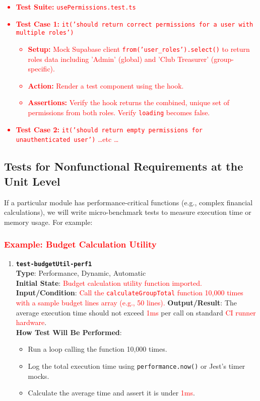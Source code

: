 \documentclass[12pt, titlepage]{article}
\begin{document}
\textcolor{red}{
\begin{itemize}
    \item \textbf{Test Suite:} \texttt{usePermissions.test.ts}
    \item \textbf{Test Case 1:} \texttt{it('should return correct permissions for a user with multiple roles')}
        \begin{itemize}
            \item \textbf{Setup:} Mock Supabase client \texttt{from('user\_roles').select()} to return roles data including 'Admin' (global) and 'Club Treasurer' (group-specific).
            \item \textbf{Action:} Render a test component using the hook.
            \item \textbf{Assertions:} Verify the hook returns the combined, unique set of permissions from both roles. Verify \texttt{loading} becomes false.
        \end{itemize}
    \item \textbf{Test Case 2:} \texttt{it('should return empty permissions for unauthenticated user')}
       \textcolor{red}{\dots etc \dots}
\end{itemize}
}

\subsection{Tests for Nonfunctional Requirements at the Unit Level}
If a particular module has performance-critical functions (e.g., complex financial calculations), we will write micro-benchmark tests to measure execution time or memory usage. For example:

\subsubsection{\textcolor{red}{Example: Budget Calculation Utility}}
\begin{enumerate}
    \item \textbf{\texttt{test-budgetUtil-perf1}} \\
        \textbf{Type}: Performance, Dynamic, Automatic \\
        \textbf{Initial State}: \textcolor{red}{Budget calculation utility function imported.}
        \textbf{Input/Condition}: \textcolor{red}{Call the \texttt{calculateGroupTotal} function 10,000 times with a sample budget lines array (e.g., 50 lines).}
        \textbf{Output/Result}: The average execution time should not exceed \textcolor{red}{1ms} per call on standard \textcolor{red}{CI runner hardware}. \\
        \textbf{How Test Will Be Performed}:
        \begin{itemize}
            \item Run a loop calling the function 10,000 times.
            \item Log the total execution time using \texttt{performance.now()} or Jest's timer mocks.
            \item Calculate the average time and assert it is under \textcolor{red}{1ms}.
        \end{itemize}
\end{enumerate}
\end{document}

